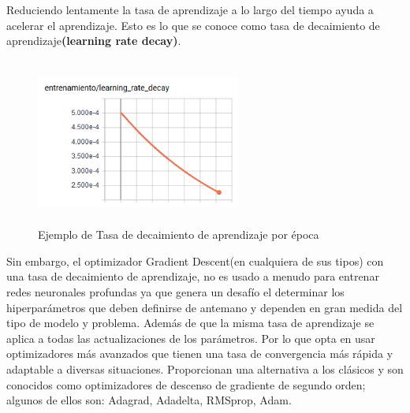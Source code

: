 		Reduciendo lentamente la tasa de aprendizaje a lo largo del tiempo ayuda a acelerar el aprendizaje. Esto es lo que se conoce como tasa de decaimiento de aprendizaje{\bf(learning rate decay)}.
			\begin{figure}[H]
				\begin{center}
				\includegraphics[width=0.6\textwidth,height=5.5cm]{images/desarrollo/entrenamiento/LR_decay} 
				\end{center}
				\begin{center}
				\caption{\small{Ejemplo de Tasa de decaimiento de aprendizaje por época  }}
				\vspace{-0.5em}
				{\small{\fontsize{10}{16.8}\selectfont {Fuente: Elaboración propia}}}
				\end{center}
				\vspace{-1.5em}
			\end{figure}
		Sin embargo, el optimizador Gradient Descent(en cualquiera de sus tipos) con una tasa de decaimiento de aprendizaje, no es usado a menudo para entrenar redes neuronales profundas ya que genera un desafío el determinar los hiperparámetros que deben definirse de antemano y dependen en gran medida del tipo de modelo y problema. Además de que la misma tasa de aprendizaje se aplica a todas las actualizaciones de los parámetros. Por lo que opta en usar optimizadores más avanzados que tienen una tasa de convergencia más rápida y adaptable a diversas situaciones. Proporcionan una alternativa a los clásicos y son conocidos como optimizadores de descenso de gradiente de segundo orden; algunos de ellos son: Adagrad, Adadelta, RMSprop, Adam. 

